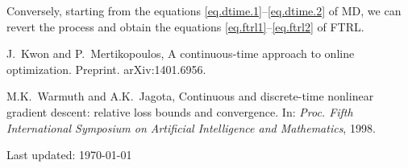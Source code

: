 \documentclass[12pt]{article}
\theoremstyle{plain}
\theoremstyle{definition}
\theoremstyle{remark}
\begin{document}
\medskip

Conversely, starting from the equations \eqref{eq.dtime.1}--\eqref{eq.dtime.2} of MD,
we can revert the process and obtain the equations \eqref{eq.ftrl1}--\eqref{eq.ftrl2} of FTRL.

\medskip

\begin{thebibliography}{biblio}

  J.~Kwon and P.~Mertikopoulos,
  A continuous-time approach to online optimization.
  Preprint. arXiv:1401.6956.

  M.K.~Warmuth and A.K.~Jagota,
  Continuous and discrete-time nonlinear gradient descent: relative loss bounds and convergence.
  In: 
  \textit{Proc. Fifth International Symposium on Artificial Intelligence and Mathematics}, 1998.


\end{thebibliography}


\vspace{.5cm}


\noindent
Last updated: \today
\end{document}
